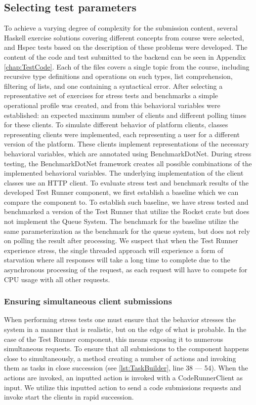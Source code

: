 \subsection{Selecting test parameters}
To achieve a varying degree of complexity for the submission content, several Haskell exercise solutions covering different concepts from course were selected, and Hspec tests based on the description of these problems were developed. 
The content of the code and test submitted to the backend can be seen in Appendix \ref{chap:TestCode}.
Each of the files covers a single topic from the course, including recursive type definitions and operations on such types, list comprehension, filtering of lists, and one containing a syntactical error.
After selecting a representative set of exercises for stress tests and benchmarks a simple operational profile was created, and from this behavioral variables were established: an expected maximum number of clients and different polling times for these clients.
To simulate different behavior of platform clients, classes representing clients were implemented, each representing a user for a different version of the platform.
These clients implement representations of the necessary behavioral variables, which are annotated using BenchmarkDotNet.
During stress testing, the BenchmarkDotNet framework creates all possible combinations of the implemented behavioral variables.
The underlying implementation of the client classes use an HTTP client.
To evaluate stress test and benchmark results of the developed Test Runner component, we first establish a baseline which we can compare the component to. 
To establish such baseline, we have stress tested and benchmarked a version of the Test Runner that utilize the Rocket crate but does not implement the Queue System. 
The benchmark for the baseline utilize the same parameterization as the benchmark for the queue system, but does not rely on polling the result after processing. 
We suspect that when the Test Runner experience stress, the single threaded approach will experience a form of starvation where all responses will take a long time to complete due to the asynchronous processing of the request, as each request will have to compete for CPU usage with all other requests.

\subsubsection{Ensuring simultaneous client submissions}
When performing stress tests one must ensure that the behavior stresses the system in a manner that is realistic, but on the edge of what is probable.
In the case of the Test Runner component, this means exposing it to numerous simultaneous requests. 
To ensure that all submissions to the component happens close to simultaneously, a method creating a number of actions and invoking them as tasks in close succession (see \ref{lst:TaskBuilder}, line 38 --- 54). 
When the actions are invoked, an inputted action is invoked with a CodeRunnerClient as input. 
We utilize this inputted action to send a code submissions requests and invoke start the clients in rapid succession.

